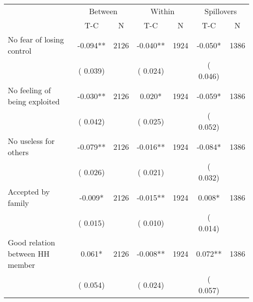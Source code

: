 
\begin{tabular}{l*{6}{c}}\hline&\multicolumn{2}{c}{Between}&\multicolumn{2}{c}{Within}&\multicolumn{2}{c}{Spillovers} \\ \cmidrule(r){2-3}\cmidrule(l){4-5}\cmidrule(l){6-7} & {T-C} & {N} & {T-C} & {N}  & {T-C}  & {N}  \\ \midrule
No fear of losing control        &             -0.094**      &       2126       &             -0.040**      &       1924       &             -0.050*      &       1386       \\
                       &       (       0.039)            &                               &       (       0.024)            &                               &       (       0.046)            &                               \\
No feeling of being exploited        &             -0.030**      &       2126       &              0.020*      &       1924       &             -0.059*      &       1386       \\
                       &       (       0.042)            &                               &       (       0.025)            &                               &       (       0.052)            &                               \\
No useless for others        &             -0.079**      &       2126       &             -0.016**      &       1924       &             -0.084*      &       1386       \\
                       &       (       0.026)            &                               &       (       0.021)            &                               &       (       0.032)            &                               \\
Accepted by family        &             -0.009*      &       2126       &             -0.015**      &       1924       &              0.008*      &       1386       \\
                       &       (       0.015)            &                               &       (       0.010)            &                               &       (       0.014)            &                               \\
Good relation between HH member        &              0.061*      &       2126       &             -0.008**      &       1924       &              0.072**      &       1386       \\
                       &       (       0.054)            &                               &       (       0.024)            &                               &       (       0.057)            &                               \\

\end{tabular}
